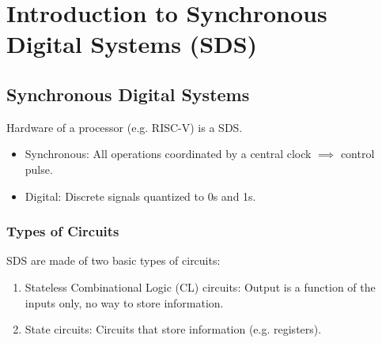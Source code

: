 \chapter{Introduction to Synchronous Digital Systems (SDS)}

\section{Synchronous Digital Systems}
Hardware of a processor (e.g. RISC-V) is a SDS.
\begin{itemize}
    \item Synchronous: All operations coordinated by a central clock $\implies$ control pulse.
    \item Digital: Discrete signals quantized to 0s and 1s.
\end{itemize}

\subsection{Types of Circuits}
SDS are made of two basic types of circuits:
\begin{enumerate}
    \item Stateless Combinational Logic (CL) circuits: Output is a function of the inputs only, no way to store information.
    \item State circuits: Circuits that store information (e.g. registers).
\end{enumerate}

